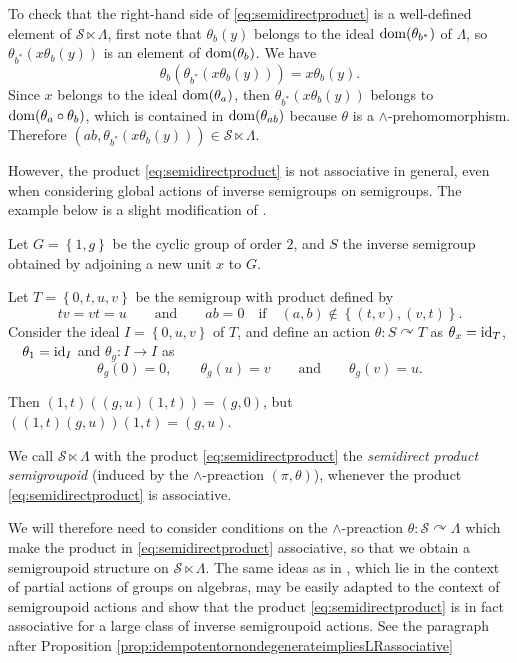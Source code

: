 To check that the right-hand side of \eqref{eq:semidirectproduct} is a well-defined element of $\mathcal{S}\ltimes\Lambda$, first note that $\theta_b(y)$ belongs to the ideal $\operatorname{dom}(\theta_{b^*})$ of $\Lambda$, so $\theta_{b^*}(x\theta_b(y))$ is an element of $\operatorname{dom}(\theta_b)$. We have
\[\theta_b(\theta_{b^*}(x\theta_b(y)))=x\theta_b(y).\]
Since $x$ belongs to the ideal $\operatorname{dom}(\theta_a)$, then $\theta_{b^*}(x\theta_b(y))$ belongs to $\operatorname{dom}(\theta_a\circ\theta_b)$, which is contained in $\operatorname{dom}(\theta_{ab})$ because $\theta$ is a $\land$-prehomomorphism. Therefore $(ab,\theta_{b^*}(x\theta_b(y)))\in\mathcal{S}\ltimes\Lambda$.

However, the product \eqref{eq:semidirectproduct} is not associative in general, even when considering global actions of inverse semigroups on semigroups. The example below is a slight modification of \cite[Example 3.5]{MR2115083}.

\begin{example}
Let $G=\left\{1,g\right\}$ be the cyclic group of order $2$, and $S$ the inverse semigroup obtained by adjoining a new unit $x$ to $G$.

Let $T=\left\{0,t,u,v\right\}$ be the semigroup with product defined by
\[tv=vt=u\qquad\text{and}\qquad ab=0\quad\text{if}\quad(a,b)\not\in\left\{(t,v),(v,t)\right\}.\]
Consider the ideal $I=\left\{0,u,v\right\}$ of $T$, and define an action $\theta\colon S\curvearrowright T$ as $\theta_x=\operatorname{id}_T$, $\quad\theta_1=\operatorname{id}_I$ and $\theta_g\colon I\to I$ as
\[\theta_g(0)=0,\qquad\theta_g(u)=v\qquad\text{and}\qquad\theta_g(v)=u.\]

Then $(1,t)((g,u)(1,t))=(g,0)$, but $((1,t)(g,u))(1,t)=(g,u)$.
\end{example}

\begin{definition}
	We call $\mathcal{S}\ltimes\Lambda$ with the product \eqref{eq:semidirectproduct} the \emph{semidirect product semigroupoid} (induced by the $\land$-preaction $(\pi,\theta)$), whenever the product \eqref{eq:semidirectproduct} is associative.
\end{definition}

We will therefore need to consider conditions on the $\land$-preaction $\theta\colon\mathcal{S}\curvearrowright\Lambda$ which make the product in \eqref{eq:semidirectproduct} associative, so that we obtain a semigroupoid structure on $\mathcal{S}\ltimes\Lambda$. The same ideas as in \cite[Section 3]{MR2115083}, which lie in the context of partial actions of groups on algebras, may be easily adapted to the context of semigroupoid actions and show that the product \eqref{eq:semidirectproduct} is in fact associative for a large class of inverse semigroupoid actions. See the paragraph after Proposition \ref{prop:idempotentornondegenerateimpliesLRassociative}

